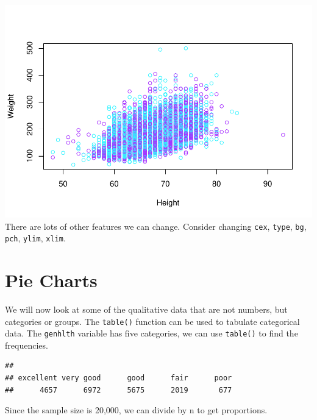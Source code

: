 \documentclass[
]{book}
\newenvironment{Shaded}{\begin{snugshade}}{\end{snugshade}}
\newcommand{\DecValTok}[1]{\textcolor[rgb]{0.00,0.00,0.81}{#1}}
\newcommand{\KeywordTok}[1]{\textcolor[rgb]{0.13,0.29,0.53}{\textbf{#1}}}
\newcommand{\NormalTok}[1]{#1}
\newcommand{\OperatorTok}[1]{\textcolor[rgb]{0.81,0.36,0.00}{\textbf{#1}}}
\begin{document}
\includegraphics{_main_files/figure-latex/unnamed-chunk-181-1.pdf}
There are lots of other features we can change. Consider changing \texttt{cex}, \texttt{type}, \texttt{bg}, \texttt{pch}, \texttt{ylim}, \texttt{xlim}.

\hypertarget{pie-charts}{%
\section{Pie Charts}\label{pie-charts}}

We will now look at some of the qualitative data that are not numbers, but categories or groups. The \texttt{table()} function can be used to tabulate categorical data. The \texttt{genhlth} variable has five categories, we can use \texttt{table()} to find the frequencies.

\begin{Shaded}
\end{Shaded}

\begin{verbatim}
## 
## excellent very good      good      fair      poor 
##      4657      6972      5675      2019       677
\end{verbatim}

Since the sample size is 20,000, we can divide by n to get proportions.

\begin{Shaded}
\end{Shaded}
\end{document}
